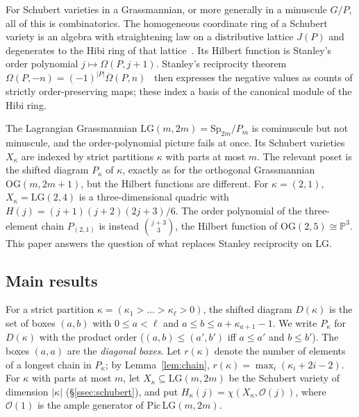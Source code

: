 \documentclass[11pt]{amsart}
\theoremstyle{definition}
\theoremstyle{remark}
\newcommand{\LG}{\mathrm{LG}}
\newcommand{\OG}{\mathrm{OG}}
\newcommand{\cO}{\mathcal{O}}
\newcommand{\Om}{\Omega}
\newcommand{\Omb}{\overline{\Omega}}
\begin{document}
For Schubert varieties in a Grassmannian, or more generally in a minuscule $G/P$, all of
this is combinatorics. The homogeneous coordinate ring of a Schubert variety is an algebra
with straightening law on a distributive lattice $J(P)$ and degenerates to the Hibi ring
of that lattice~\cite{Hibi87,GL96,Seshadri}. Its Hilbert function is Stanley's order
polynomial $j\mapsto\Om(P,j+1)$. Stanley's reciprocity theorem
$\Om(P,-n)=(-1)^{|P|}\Omb(P,n)$~\cite{Stanley70,EC1} then expresses the negative values as
counts of strictly order-preserving maps; these index a basis of the canonical module of the
Hibi ring.

The Lagrangian Grassmannian $\LG(m,2m)=\mathrm{Sp}_{2m}/P_m$ is cominuscule but not
minuscule, and the order-polynomial picture fails at once. Its Schubert varieties
$X_\kappa$ are indexed by strict partitions $\kappa$ with parts at most $m$. The relevant
poset is the shifted diagram $P_\kappa$ of $\kappa$, exactly as for the orthogonal
Grassmannian $\OG(m,2m+1)$, but the Hilbert functions are different. For $\kappa=(2,1)$,
$X_\kappa=\LG(2,4)$ is a three-dimensional quadric with $H(j)=(j+1)(j+2)(2j+3)/6$. The
order polynomial of the three-element chain $P_{(2,1)}$ is instead $\binom{j+3}{3}$, the
Hilbert function of $\OG(2,5)\cong\mathbb{P}^3$. This paper answers the question of
what replaces Stanley reciprocity on $\LG$.

\subsection{Main results}
For a strict partition $\kappa=(\kappa_1>\dots>\kappa_\ell>0)$, the shifted diagram
$D(\kappa)$ is the set of boxes $(a,b)$ with $0\le a<\ell$ and $a\le b\le a+\kappa_{a+1}-1$.
We write $P_\kappa$ for $D(\kappa)$ with the product order ($(a,b)\le(a',b')$ iff $a\le a'$
and $b\le b'$). The boxes $(a,a)$ are the \emph{diagonal boxes}. Let $r(\kappa)$ denote
the number of elements of a longest chain in $P_\kappa$; by Lemma~\ref{lem:chain},
$r(\kappa)=\max_i(\kappa_i+2i-2)$. For $\kappa$ with parts at most $m$, let
$X_\kappa\subseteq\LG(m,2m)$ be the Schubert variety of dimension $|\kappa|$
(\S\ref{ssec:schubert}), and put $H_\kappa(j)=\chi(X_\kappa,\cO(j))$, where $\cO(1)$ is
the ample generator of $\mathrm{Pic}\,\LG(m,2m)$.
\end{document}
